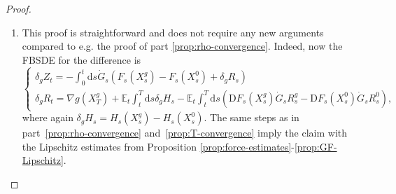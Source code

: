 \documentclass[11pt, a4paper]{scrartcl}
\numberwithin{equation}{section}
\theoremstyle{plain}
\theoremstyle{remark}
\newcommand{\mathD}{\mathrm{D}}
\newcommand{\mathd}{\mathrm{d}}
\newenvironment{enumeratealpha}{\begin{enumerate}[a{\textup{)}}] }{\end{enumerate}}
\begin{document}
\begin{proof}
\begin{enumeratealpha}
    \ref{prop:force-estimates}-\ref{prop:fe-T-dependence}
    and \ref{prop:force-estimates}-\ref{prop:GF-bounds},
    \[ \begin{aligned}
         \int_t^{T_2} \mathd s \| H_s^{T_1} (X^{T_1}_s) - H_s^{T_2}
         (X^{T_2}_s) \|_{L^{\infty}} & \lesssim  \bar{\lambda} \sup_s \| \delta_T
         Z_s \|_{L^{\infty}} + \bar{\lambda} \langle T_2 \rangle^{- \varepsilon},
       \end{aligned} \]
    and
    \begin{align*}
      \int_t^{T_2} &\mathd s \| \mathD F_s^{T_1} (X_s^{T_1})  \dot{G}_s
       R_s^{T_1} - \mathD F_s^{T_2} (X_s^{T_2})  \dot{G}_s R_s^{T_2}
       \|_{L^{\infty}} \\&\lesssim \bar{\lambda} (\sup_s \| \delta_T Z_s
       \|_{L^{\infty}} + \sup_s \| \delta_T R_s \|_{L^{\infty}} + \langle T_2
       \rangle^{- \varepsilon}).
    \end{align*}
    The integrals on $[T_2, T_1]$ can be estimated using just the boundedness
    of the coefficients provided by Proposition
    \ref{prop:force-estimates}-\ref{prop:GF-bounds},
    \begin{align*}
      \int_{T_2}^{T_1} \mathd s \| H_s^{T_1} (X^{T_1}_s) \|_{L^{\infty}} +
       \int_{T_2}^{T_1} \mathd s \| \mathD F_s^{T_1} (X_s^{T_1})  \dot{G}_s
       R_s^{T_1} \|_{L^{\infty}} 
       &\lesssim \bar{\lambda} \int_{T_2}^{T_1} \mathd s
       \langle s \rangle^{- 4 \delta} + \langle s \rangle^{- 1 - \delta}\\
       &\lesssim \bar{\lambda} \langle T_2 \rangle^{- \varepsilon}.
    \end{align*}
    Finally, by the regularity assumed on $g$,
    \[ \| \nabla g (X^{T_1}_{T_1}) - \nabla g (X^{T_2}_{T_2}) \|_{L^{\infty}}
       \lesssim \bar{\lambda} | g |_{2, \infty}  \| X^{T_1}_{T_2} - X^{T_2}_{T_2}
       \|_{L^{\infty}} \lesssim \bar{\lambda} \sup_s \| \delta X_s \|_{L^{\infty}} .
    \]
    Combining all of the above yields the claim for $\bar{\lambda}$ small enough
    after rearranging.
    
    \item This proof is straightforward and does not require any new arguments
    compared to e.g. the proof of part \ref{prop:rho-convergence}. Indeed, now
    the FBSDE for the difference is
    \[ \begin{cases}
         \delta_g Z_t = - \int_0^t \mathd s \dot{G}_s (F_s (X^g_s) - F_s
         (X^0_s) + \delta_g R_s)\\
         \delta_g R_t = \nabla g (X^g_T) +\mathbb{E}_t  \int_t^T \mathd s
         \delta_g H_s - \mathbb{E}_t  \int_t^T \mathd s \left( \mathD F_s
         (X^g_s)  \dot{G}_s R^g_s - \mathD F_s  (X_s^0)  \dot{G}_s R_s^0
         \right),
       \end{cases} \]
    where again $\delta_g H_s = H_s (X^g_s) - H_s (X^0_s)$. The same steps as
    in part~\ref{prop:rho-convergence} and~\ref{prop:T-convergence} imply the
    claim with the Lipschitz estimates from Proposition
    \ref{prop:force-estimates}-\ref{prop:GF-Lipschitz}.
  \end{enumeratealpha}
\end{proof}
\end{document}

